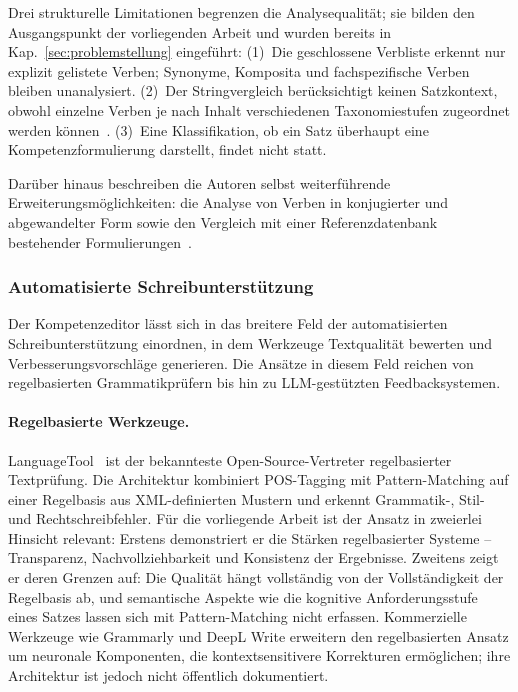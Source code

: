 Drei strukturelle Limitationen begrenzen die Analysequalität; sie bilden den Ausgangspunkt der vorliegenden Arbeit und wurden bereits in Kap.~\ref{sec:problemstellung} eingeführt:
(1)~Die geschlossene Verbliste erkennt nur explizit gelistete Verben; Synonyme, Komposita und fachspezifische Verben bleiben unanalysiert.
(2)~Der Stringvergleich berücksichtigt keinen Satzkontext, obwohl einzelne Verben je nach Inhalt verschiedenen Taxonomiestufen zugeordnet werden können~\cite{stanny2016reevaluating}.
(3)~Eine Klassifikation, ob ein Satz überhaupt eine Kompetenzformulierung darstellt, findet nicht statt.

Darüber hinaus beschreiben die Autoren selbst weiterführende Erweiterungsmöglichkeiten: die Analyse von Verben in konjugierter und abgewandelter Form sowie den Vergleich mit einer Referenzdatenbank bestehender Formulierungen~\cite{loth2022kompetenzeditor}.

\subsubsection{Automatisierte Schreibunterstützung}\label{sec:relwork-textimprovement}

Der Kompetenzeditor lässt sich in das breitere Feld der automatisierten Schreibunterstützung einordnen, in dem Werkzeuge Textqualität bewerten und Verbesserungsvorschläge generieren.
Die Ansätze in diesem Feld reichen von regelbasierten Grammatikprüfern bis hin zu LLM-gestützten Feedbacksystemen.

\paragraph{Regelbasierte Werkzeuge.}

LanguageTool~\cite{naber2003languagetool} ist der bekannteste Open-Source-Vertreter regelbasierter Textprüfung.
Die Architektur kombiniert POS-Tagging mit Pattern-Matching auf einer Regelbasis aus XML-definierten Mustern und erkennt Grammatik-, Stil- und Rechtschreibfehler.
Für die vorliegende Arbeit ist der Ansatz in zweierlei Hinsicht relevant: Erstens demonstriert er die Stärken regelbasierter Systeme -- Transparenz, Nachvollziehbarkeit und Konsistenz der Ergebnisse.
Zweitens zeigt er deren Grenzen auf: Die Qualität hängt vollständig von der Vollständigkeit der Regelbasis ab, und semantische Aspekte wie die kognitive Anforderungsstufe eines Satzes lassen sich mit Pattern-Matching nicht erfassen.
Kommerzielle Werkzeuge wie Grammarly und DeepL Write erweitern den regelbasierten Ansatz um neuronale Komponenten, die kontextsensitivere Korrekturen ermöglichen; ihre Architektur ist jedoch nicht öffentlich dokumentiert.

